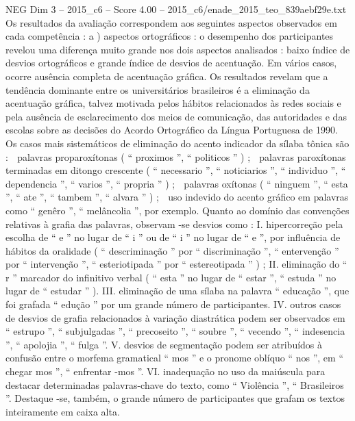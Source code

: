 \begin{textsample}{NEG Dim 3 – 2015\_c6 – Score 4.00 – 2015\_c6/enade\_2015\_teo\_839aebf29e.txt}
Os resultados da avaliação correspondem aos seguintes aspectos observados em cada competência : a ) aspectos ortográficos : o desempenho dos participantes revelou uma diferença muito grande nos dois aspectos analisados : baixo índice de desvios ortográficos e grande índice de desvios de acentuação.
Em vários casos, ocorre ausência completa de acentuação gráfica.
Os resultados revelam que a tendência dominante entre os universitários brasileiros é a eliminação da acentuação gráfica, talvez motivada pelos hábitos relacionados às redes sociais e pela ausência de esclarecimento dos meios de comunicação, das autoridades e das escolas sobre as decisões do Acordo Ortográfico da Língua Portuguesa de 1990.
Os casos mais sistemáticos de eliminação do acento indicador da sílaba tônica são :  palavras proparoxítonas ( “ proximos ”, “ politicos ” ) ;  palavras paroxítonas terminadas em ditongo crescente ( “ necessario ”, “ noticiarios ”, “ individuo ”, “ dependencia ”, “ varios ”, “ propria ” ) ;  palavras oxítonas ( “ ninguem ”, “ esta ”, “ ate ”, “ tambem ”, “ alvara ” ) ;  uso indevido do acento gráfico em palavras como “ genêro ”, “ melâncolia ”, por exemplo.
Quanto ao domínio das convenções relativas à grafia das palavras, observam -se desvios como : I. hipercorreção pela escolha de “ e ” no lugar de “ i ” ou de “ i ” no lugar de “ e ”, por influência de hábitos da oralidade ( “ descriminação ” por “ discriminação ”, “ entervenção ” por “ intervenção ”, “ esteriotipada ” por “ estereotipada ” ) ; II. eliminação do “ r ” marcador do infinitivo verbal ( “ esta ” no lugar de “ estar ”, “ estuda ” no lugar de “ estudar ” ).
III. eliminação de uma sílaba na palavra “ educação ”, que foi grafada “ edução ” por um grande número de participantes.
IV. outros casos de desvios de grafia relacionados à variação diastrática podem ser observados em “ estrupo ”, “ subjulgadas ”, “ precoseito ”, “ soubre ”, “ vecendo ”, “ indesencia ”, “ apolojia ”, “ fulga ”.
V. desvios de segmentação podem ser atribuídos à confusão entre o morfema gramatical “ mos ” e o pronome oblíquo “ nos ”, em “ chegar mos ”, “ enfrentar -mos ”.
VI. inadequação no uso da maiúscula para destacar determinadas palavras-chave do texto, como “ Violência ”, “ Brasileiros ”.
Destaque -se, também, o grande número de participantes que grafam os textos inteiramente em caixa alta.

\end{textsample}
